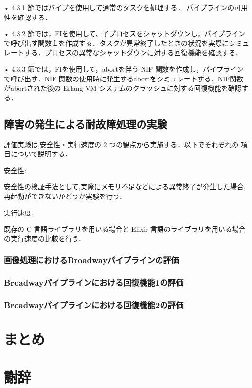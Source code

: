 \documentclass[a4paper]{jreport}	%
\begin{document}
• 4.3.1 節ではパイプを使用して通常のタスクを処理する． パイプラインの可用性を確認する．

• 4.3.2 節では，FIを使用して、子プロセスをシャットダウンし，パイプラインで呼び出す関数１を作成する．タスクが異常終了したときの状況を実際にシミュレートする．プロセスの異常なシャットダウンに対する回復機能を確認する．

• 4.3.3 節では，FIを使用して，abortを伴う NIF 関数を作成し，パイプラインで呼び出す．NIF 関数の使用時に発生するabortをシミュレートする．NIF関数がabortされた後の Erlang VM システムのクラッシュに対する回復機能を確認する．


\section{障害の発生による耐故障処理の実験}
評価実験は,安全性・実行速度の 2 つの観点から実施する．以下でそれぞれの 項目について説明する．

安全性:

安全性の検証手法として,実際にメモリ不足などによる異常終了が発生した場合,再起動ができないかどうか実験を行う．

実行速度: 

既存の C 言語ライブラリを用いる場合と Elixir 言語のライブラリを用いる場合の実行速度の比較を行う．
\subsection{画像処理におけるBroadwayパイプラインの評価} 

\subsection{Broadwayパイプラインにおける回復機能1の評価} 

\subsection{Broadwayパイプラインにおける回復機能2の評価}



\chapter{まとめ}

\chapter*{謝辞}

\end{document}
